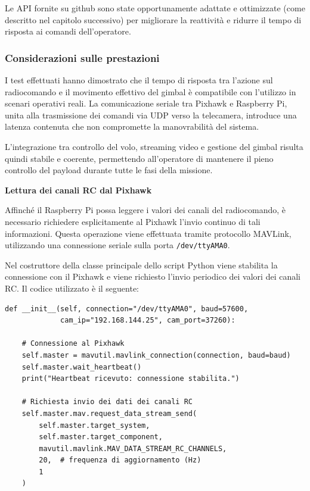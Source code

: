 Le API fornite su github \cite{siyi_sdk_repo} sono state opportunamente adattate e ottimizzate (come descritto nel capitolo successivo) per migliorare la reattività e ridurre il tempo di risposta ai comandi dell’operatore.

\subsubsection{Considerazioni sulle prestazioni}

I test effettuati hanno dimostrato che il tempo di risposta tra l’azione sul radiocomando e il movimento effettivo del gimbal è compatibile con l’utilizzo in scenari operativi reali.  
La comunicazione seriale tra Pixhawk e Raspberry Pi, unita alla trasmissione dei comandi via UDP verso la telecamera, introduce una latenza contenuta che non compromette la manovrabilità del sistema.

L’integrazione tra controllo del volo, streaming video e gestione del gimbal risulta quindi stabile e coerente, permettendo all’operatore di mantenere il pieno controllo del payload durante tutte le fasi della missione.

\bigskip
\noindent \textbf{Lettura dei canali RC dal Pixhawk}
\bigskip

Affinché il Raspberry Pi possa leggere i valori dei canali del radiocomando, è necessario richiedere esplicitamente al Pixhawk l’invio continuo di tali informazioni.
Questa operazione viene effettuata tramite protocollo MAVLink, utilizzando una connessione seriale sulla porta \texttt{/dev/ttyAMA0}.

Nel costruttore della classe principale dello script Python viene stabilita la connessione con il Pixhawk e viene richiesto l’invio periodico dei valori dei canali RC.
Il codice utilizzato è il seguente:

\begin{verbatim}
def __init__(self, connection="/dev/ttyAMA0", baud=57600,
             cam_ip="192.168.144.25", cam_port=37260):

    # Connessione al Pixhawk
    self.master = mavutil.mavlink_connection(connection, baud=baud)
    self.master.wait_heartbeat()
    print("Heartbeat ricevuto: connessione stabilita.")

    # Richiesta invio dei dati dei canali RC
    self.master.mav.request_data_stream_send(
        self.master.target_system,
        self.master.target_component,
        mavutil.mavlink.MAV_DATA_STREAM_RC_CHANNELS,
        20,  # frequenza di aggiornamento (Hz)
        1
    )
\end{verbatim}

